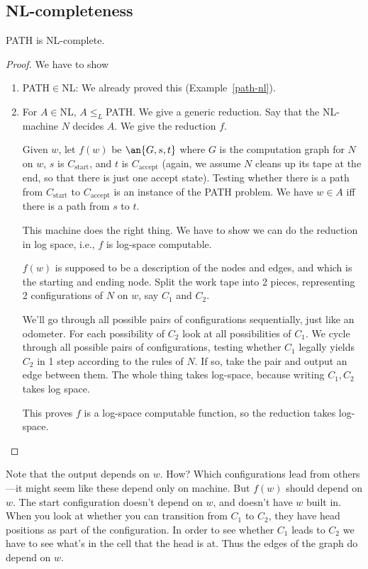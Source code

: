 \subsection{NL-completeness}
\begin{thm}
PATH is NL-complete.
\end{thm}
\begin{proof}
We have to show
\begin{enumerate}
\item
PATH$\in$NL: We already proved this (Example~\ref{path-nl}).
\item
For $A\in $NL, $A\le_L$PATH. We give a generic reduction. Say that the NL-machine $N$ decides $A$. We give the reduction $f$.

Given $w$, let $f(w)$ be $\an{G,s,t}$ where $G$ is the computation graph for $N$ on $w$, $s$ is $C_{\text{start}}$, and $t$ is $C_{\text{accept}}$ (again, we assume $N$ cleans up its tape at the end, so that there is just one accept state). Testing whether there is a path from $C_{\text{start}}$ to $C_{\text{accept}}$ is an instance of the PATH problem. We have $w\in A$ iff there is a path from $s$ to $t$.

This machine does the right thing. We have to show we can do the reduction in log space, i.e., %
$f$ is log-space computable.

$f(w)$ is supposed to be a description of the nodes and edges, and which is the starting and ending node. Split the work tape into 2 pieces, representing 2 configurations of $N$ on $w$, say $C_1$ and $C_2$. %


We'll go through all possible pairs of configurations sequentially, just like an odometer. For each possibility of $C_2$ look at all possibilities of $C_1$.
We cycle through all possible pairs of configurations, testing whether $C_1$ legally yields $C_2$ in 1 step according to the rules of $N$. If so, take the pair and output an edge between them. 
The whole thing takes log-space, because writing $C_1,C_2$ takes log space. 

This proves $f$ is a log-space computable function, so the reduction takes log-space.
\end{enumerate}
\end{proof}
Note that the output depends on $w$. How? Which configurations lead from others---it might seem like these depend only on machine. But $f(w)$ should depend on $w$. The start configuration doesn't depend on $w$, and doesn't have $w$ built in. When you look at whether you can transition from $C_1$ to $C_2$, they have head positions as part of the configuration. In order to see whether $C_1$ leads to $C_2$ we have to see what's in the cell that the head is at. Thus the edges of the graph do depend on $w$.

